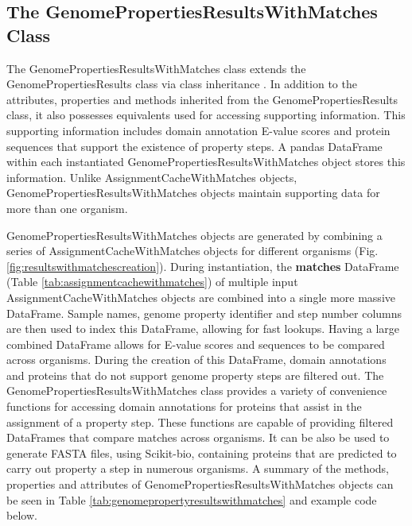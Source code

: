 \subsection{The GenomePropertiesResultsWithMatches Class} \label{PropertyResultsWithMatches}

The GenomePropertiesResultsWithMatches class extends the GenomePropertiesResults class via class inheritance \cite{snyder1986encapsulation}. In addition to the attributes, properties and methods inherited from the GenomePropertiesResults class, it also possesses equivalents used for accessing supporting information. This supporting information includes domain annotation E-value scores and protein sequences that support the existence of property steps. A pandas DataFrame within each instantiated GenomePropertiesResultsWithMatches object stores this information. Unlike AssignmentCacheWithMatches objects, GenomePropertiesResultsWithMatches objects maintain supporting data for more than one organism.

GenomePropertiesResultsWithMatches objects are generated by combining a series of AssignmentCacheWithMatches objects for different organisms (Fig. \ref{fig:resultswithmatchescreation}). During instantiation, the \textbf{matches} DataFrame (Table \ref{tab:assignmentcachewithmatches}) of multiple input AssignmentCacheWithMatches objects are combined into a single more massive DataFrame. Sample names, genome property identifier and step number columns are then used to index this DataFrame, allowing for fast lookups. Having a large combined DataFrame allows for E-value scores and sequences to be compared across organisms. During the creation of this DataFrame, domain annotations and proteins that do not support genome property steps are filtered out. The GenomePropertiesResultsWithMatches class provides a variety of convenience functions for accessing domain annotations for proteins that assist in the assignment of a property step. These functions are capable of providing filtered DataFrames that compare matches across organisms. It can be also be used to generate FASTA files, using Scikit-bio, containing proteins that are predicted to carry out property a step in numerous organisms. A summary of the methods, properties and attributes of GenomePropertiesResultsWithMatches objects can be seen in Table \ref{tab:genomepropertyresultswithmatches} and example code below. 

